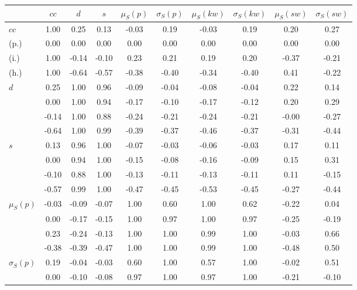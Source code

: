 \begin{table*}[h!]
\begin{center}
\begin{tabular}{| l | c | c | c | c | c | c | c | c | c |}\hline
 & $cc$ & $d$ & $s$ & $\mu_S(p)$ & $\sigma_S(p)$ & $\mu_S(kw)$ & $\sigma_S(kw)$ & $\mu_S(sw)$ & $\sigma_S(sw)$ \\\hline
$cc$ & 1.00  & 0.25  & 0.13  & -0.03  & 0.19  & -0.03  & 0.19  & 0.20  & 0.27 \\\hline
(p.) & 0.00  & 0.00  & 0.00  & 0.00  & 0.00  & 0.00  & 0.00  & 0.00  & 0.00 \\\hline
(i.) & 1.00  & -0.14  & -0.10  & 0.23  & 0.21  & 0.19  & 0.20  & -0.37  & -0.21 \\\hline
(h.) & 1.00  & -0.64  & -0.57  & -0.38  & -0.40  & -0.34  & -0.40  & 0.41  & -0.22 \\\hline
$d$ & 0.25  & 1.00  & 0.96  & -0.09  & -0.04  & -0.08  & -0.04  & 0.22  & 0.14 \\\hline
 & 0.00  & 1.00  & 0.94  & -0.17  & -0.10  & -0.17  & -0.12  & 0.20  & 0.29 \\\hline
 & -0.14  & 1.00  & 0.88  & -0.24  & -0.21  & -0.24  & -0.21  & -0.00  & -0.27 \\\hline
 & -0.64  & 1.00  & 0.99  & -0.39  & -0.37  & -0.46  & -0.37  & -0.31  & -0.44 \\\hline
$s$ & 0.13  & 0.96  & 1.00  & -0.07  & -0.03  & -0.06  & -0.03  & 0.17  & 0.11 \\\hline
 & 0.00  & 0.94  & 1.00  & -0.15  & -0.08  & -0.16  & -0.09  & 0.15  & 0.31 \\\hline
 & -0.10  & 0.88  & 1.00  & -0.13  & -0.11  & -0.13  & -0.11  & 0.11  & -0.15 \\\hline
 & -0.57  & 0.99  & 1.00  & -0.47  & -0.45  & -0.53  & -0.45  & -0.27  & -0.44 \\\hline
$\mu_S(p)$ & -0.03  & -0.09  & -0.07  & 1.00  & 0.60  & 1.00  & 0.62  & -0.22  & 0.04 \\\hline
 & 0.00  & -0.17  & -0.15  & 1.00  & 0.97  & 1.00  & 0.97  & -0.25  & -0.19 \\\hline
 & 0.23  & -0.24  & -0.13  & 1.00  & 1.00  & 0.99  & 1.00  & -0.03  & 0.66 \\\hline
 & -0.38  & -0.39  & -0.47  & 1.00  & 1.00  & 0.99  & 1.00  & -0.48  & 0.50 \\\hline
$\sigma_S(p)$ & 0.19  & -0.04  & -0.03  & 0.60  & 1.00  & 0.57  & 1.00  & -0.02  & 0.51 \\\hline
 & 0.00  & -0.10  & -0.08  & 0.97  & 1.00  & 0.97  & 1.00  & -0.21  & -0.10 \\\hline

\end{tabular}
\end{center}
\end{table*}

